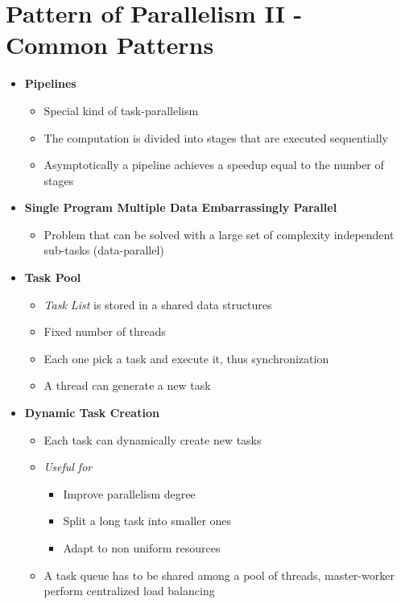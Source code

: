 \documentclass[12pt,oneside]{report}
\begin{document}
\chapter{Pattern of Parallelism II - Common Patterns}
\begin{itemize}
    \item \textbf{Pipelines}
    \begin{itemize}
        \item Special kind of task-parallelism
        \item The computation is divided into stages that are executed sequentially
        \item Asymptotically a pipeline achieves a speedup equal to the number of stages
    \end{itemize}
    \item \textbf{Single Program Multiple Data Embarrassingly Parallel}
    \begin{itemize}
        \item Problem that can be solved with a large set of complexity independent sub-tasks (data-parallel)
    \end{itemize}
    \item \textbf{Task Pool}
    \begin{itemize}
        \item \textit{Task List} is stored in a shared data structures
        \item Fixed number of threads
        \item Each one pick a task and execute it, thus synchronization
        \item A thread can generate a new task
    \end{itemize}
    \item \textbf{Dynamic Task Creation}
    \begin{itemize}
        \item Each task can dynamically create new tasks
        \item \textit{Useful for}
        \begin{itemize}
            \item Improve parallelism degree
            \item Split a long task into smaller ones
            \item Adapt to non uniform resources
        \end{itemize}
        \item A task queue has to be shared among a pool of threads, master-worker perform centralized load balancing

\end{itemize}
\end{itemize}
\end{document}
